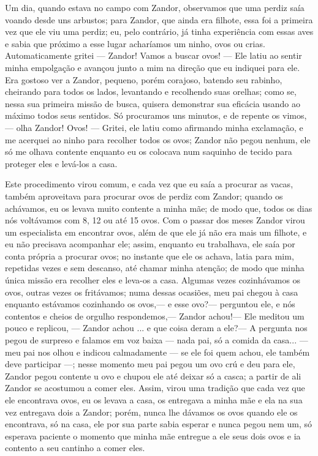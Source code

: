 Um dia, quando estava no campo com Zandor, observamos que uma perdiz saía voando desde uns arbustos; para Zandor, que ainda era filhote, essa foi a primeira vez que ele viu uma perdiz; eu, pelo contrário, já tinha experiência com essas aves e sabia que próximo a esse lugar acharíamos um ninho, ovos ou crias. 
Automaticamente gritei --- Zandor! Vamos a buscar ovos! --- Ele latiu ao sentir minha empolgação e avançou junto a mim na direção que eu indiquei para ele. 
Era gostoso ver a Zandor, pequeno, porém corajoso, batendo seu rabinho, cheirando para todos os lados, levantando e recolhendo suas orelhas; como se, nessa sua primeira missão de busca, quisera demonstrar sua eficácia usando ao máximo todos seus sentidos. 
Só procuramos uns minutos, e de repente os vimos, --- olha Zandor! Ovos! --- Gritei, ele latiu como afirmando minha exclamação, e me acerquei ao ninho para recolher todos os ovos; Zandor não pegou nenhum, ele só me olhava contente enquanto eu os colocava num saquinho de tecido para proteger eles e levá-los a casa. 

Este procedimento virou comum, e cada vez que eu saía a procurar as vacas, também aproveitava para procurar ovos de perdiz com Zandor; quando os achávamos, eu os levava muito contente a minha mãe; de modo que, todos os dias nós voltávamos com 8, 12 ou até 15 ovos. 
Com o passar dos meses Zandor virou um especialista em encontrar ovos, além de que ele já não era mais um filhote, e eu não precisava acompanhar ele; assim, enquanto eu trabalhava, ele saía por conta própria a procurar ovos; no instante que ele os achava, latia para mim, repetidas vezes e sem descanso, até chamar minha atenção; de modo que minha única missão era recolher eles e leva-os a casa.
Algumas vezes cozinhávamos os ovos, outras vezes os fritávamos; numa dessas ocasiões, meu pai chegou à casa enquanto estávamos cozinhando os ovos,--- e esse ovo?--- perguntou ele, e nós contentos e cheios de orgulho respondemos,--- Zandor achou!---
Ele meditou um pouco e replicou, --- Zandor achou ... e que coisa deram a ele?--- A pergunta nos pegou de surpreso e falamos em voz baixa --- nada pai, só a comida da casa... --- meu pai nos olhou e indicou calmadamente --- se ele foi quem achou, ele também deve participar ---; 
nesse momento meu pai pegou um ovo crú e deu para ele, Zandor pegou contente u ovo e chupou ele até deixar só a casca; a partir de ali Zandor se acostumou a comer eles. Assim, virou uma tradição que cada vez que ele encontrava ovos, eu os levava a casa, os entregava a minha mãe e ela na sua vez entregava dois a Zandor; porém, nunca lhe dávamos os ovos quando ele os encontrava, só na casa, ele por sua parte sabia esperar e nunca pegou nem um, só esperava paciente o momento que minha mãe entregue a ele seus dois ovos e ia contento a seu cantinho a comer eles.


